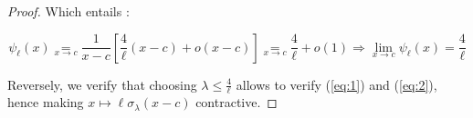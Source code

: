 \documentclass[11pt]{scrartcl}
\begin{document}
\begin{proof}
Which entails :

$$
\psi_\ell(x)\underset{x \rightarrow c}{=}\frac{1}{x-c}\left[\frac{4}{\ell}\left(x - c\right) + o\left(x - c\right)\right] \underset{x \rightarrow c}{=}\frac{4}{\ell} + o(1)\Rightarrow \lim_{x\rightarrow c}\psi_\ell(x) = \frac{4}{\ell}
$$

Reversely, we verify that choosing $\lambda \leq \frac{4}{\ell}$ allows to verify (\ref{eq:1}) and (\ref{eq:2}), hence making $x\mapsto\ell\sigma_\lambda(x-c)$ contractive.
\end{proof}
\end{document}
